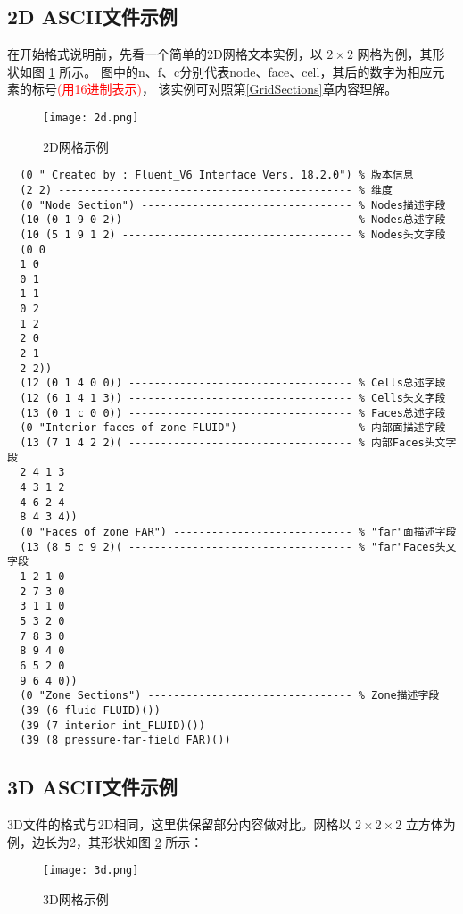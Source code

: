 \documentclass[lang=cn,11pt,a4paper]{elegantpaper} %
\begin{document}
\subsection{2D ASCII文件示例}
在开始格式说明前，先看一个简单的2D网格文本实例，以 $2\times2$ 网格为例，其形状如图 \ref{2dMesh} 所示。
图中的n、f、c分别代表node、face、cell，其后的数字为相应元素的标号\textcolor{red}{(用16进制表示)}，
该实例可对照第\ref{GridSections}章内容理解。

\begin{figure}[!htb]
  \centering
  \texttt{[image: 2d.png]}
  \caption{2D网格示例}
  \label{2dMesh}
\end{figure}

\begin{lstlisting}
  (0 " Created by : Fluent_V6 Interface Vers. 18.2.0") % 版本信息
  (2 2) ---------------------------------------------- % 维度
  (0 "Node Section") --------------------------------- % Nodes描述字段
  (10 (0 1 9 0 2)) ----------------------------------- % Nodes总述字段
  (10 (5 1 9 1 2) ------------------------------------ % Nodes头文字段
  (0 0
  1 0
  0 1
  1 1
  0 2
  1 2
  2 0
  2 1
  2 2))
  (12 (0 1 4 0 0)) ----------------------------------- % Cells总述字段
  (12 (6 1 4 1 3)) ----------------------------------- % Cells头文字段
  (13 (0 1 c 0 0)) ----------------------------------- % Faces总述字段
  (0 "Interior faces of zone FLUID") ----------------- % 内部面描述字段
  (13 (7 1 4 2 2)( ----------------------------------- % 内部Faces头文字段
  2 4 1 3
  4 3 1 2
  4 6 2 4
  8 4 3 4))
  (0 "Faces of zone FAR") ---------------------------- % "far"面描述字段
  (13 (8 5 c 9 2)( ----------------------------------- % "far"Faces头文字段
  1 2 1 0
  2 7 3 0
  3 1 1 0
  5 3 2 0
  7 8 3 0
  8 9 4 0
  6 5 2 0
  9 6 4 0))
  (0 "Zone Sections") -------------------------------- % Zone描述字段
  (39 (6 fluid FLUID)())
  (39 (7 interior int_FLUID)())
  (39 (8 pressure-far-field FAR)()) 
\end{lstlisting}

\subsection{3D ASCII文件示例}

3D文件的格式与2D相同，这里供保留部分内容做对比。网格以 $2\times2\times2$ 立方体为例，边长为2，其形状如图 \ref{3dMesh} 所示：
\begin{figure}[!htb]
  \centering
  \texttt{[image: 3d.png]}
  \caption{3D网格示例}
  \label{3dMesh}
\end{figure}
\end{document}

